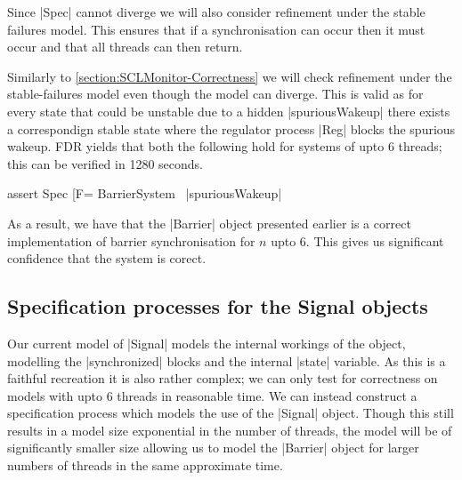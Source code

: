 Since |Spec| cannot diverge we will also consider refinement under the stable failures model. This ensures that if a synchronisation can occur then it must occur and that all threads can then return.


Similarly to \ref{section:SCLMonitor-Correctness} we will check refinement under the stable-failures model even though the model can diverge. This is valid as for every state that could be unstable due to a hidden |spuriousWakeup| there exists a correspondign stable state where the regulator process |Reg| blocks the spurious wakeup.
FDR yields that both the following hold for systems of upto 6 threads; this can be verified in 1280 seconds.

\begin{cspm}
assert Spec [F= BarrierSystem \ {|spuriousWakeup|}
\end{cspm}

As a result, we have that the |Barrier| object presented earlier is a correct implementation of barrier synchronisation for $n$ upto 6. This gives us significant confidence that the system is corect.

\subsection{Specification processes for the Signal objects}

Our current model of |Signal| models the internal workings of the object, modelling the |synchronized| blocks and the internal |state| variable. As this is a faithful recreation it is also rather complex; we can only test for correctness on models with upto 6 threads in reasonable time.
We can instead construct a specification process which models the use of the |Signal| object. Though this still results in a model size exponential in the number of threads, the model will be of significantly smaller size allowing us to model the |Barrier| object for larger numbers of threads in the same approximate time.


